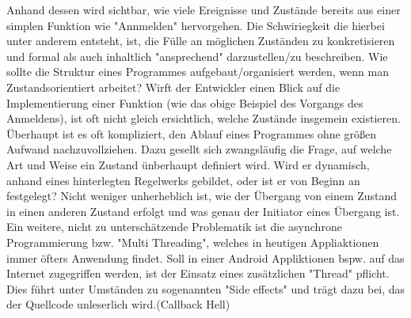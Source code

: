 Anhand dessen wird sichtbar, wie viele Ereignisse und Zustände bereits aus einer simplen Funktion wie "Annmelden" hervorgehen.
Die Schwiriegkeit die hierbei unter anderem entsteht, ist, die Fülle an möglichen Zuständen zu konkretisieren und 
formal als auch inhaltlich "ansprechend" darzustellen/zu beschreiben.
Wie sollte die Struktur eines Programmes aufgebaut/organisiert werden, wenn man Zustandsorientiert arbeitet?
Wirft der Entwickler einen Blick auf die Implementierung  einer Funktion (wie das obige Beispiel des Vorgangs des Anmeldens), 
ist oft nicht gleich ersichtlich, welche Zustände insgemein existieren.
Überhaupt ist es oft kompliziert, den Ablauf eines Programmes ohne größen Aufwand nachzuvollziehen.
Dazu gesellt sich zwangsläufig die Frage, auf welche Art und Weise ein Zustand ünberhaupt definiert wird. 
Wird er dynamisch, anhand eines hinterlegten Regelwerks gebildet, oder ist er von Beginn an festgelegt?
Nicht weniger unherheblich ist, wie der Übergang von einem Zustand in einen anderen Zustand erfolgt und was 
genau der Initiator eines Übergang ist.
Ein weitere, nicht zu unterschätzende Problematik ist die asynchrone Programmierung bzw. "Multi Threading",
welches in heutigen Appliaktionen immer öfters Anwendung findet. Soll in einer Android Appliktionen bspw. auf das Internet
zugegriffen werden, ist der Einsatz eines zusätzlichen "Thread" pflicht.
Dies führt unter Umständen zu sogenannten "Side effects" und trägt dazu bei, das der Quellcode unleserlich wird.(Callback Hell)




% 





